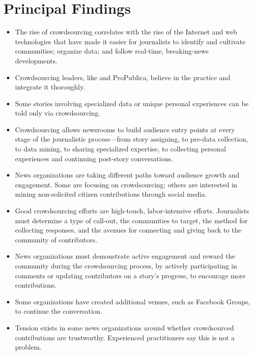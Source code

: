 \section{Principal Findings}  

\begin{itemize}
\item The rise of crowdsourcing correlates with the rise of the Internet and web technologies that have made it easier for journalists to identify and cultivate communities; organize data; and follow real-time, breaking-news developments.

\item Crowdsourcing leaders, like  and ProPublica, believe in the practice and integrate it thoroughly.

\item Some stories involving specialized data or unique personal experiences can be told only via crowdsourcing. 

\item Crowdsourcing allows newsrooms to build audience entry points at every stage of the journalistic process---from story assigning, to pre-data collection, to data mining, to sharing specialized expertise, to collecting personal experiences and continuing post-story conversations.
 
\item News organizations are taking different paths toward audience growth and engagement. Some are focusing on crowdsourcing; others are interested in mining non-solicited citizen contributions through social media.

\item Good crowdsourcing efforts are high-touch, labor-intensive efforts. Journalists must determine a type of call-out, the communities to target, the method for collecting responses, and the avenues for connecting and giving back to the community of contributors. 

\item News organizations must demonstrate active engagement and reward the community during the crowdsourcing process, by actively participating in comments or updating contributors on a story’s progress, to encourage more contributions.

\item Some organizations have created additional venues, such as Facebook Groups, to continue the conversation.

\item Tension exists in some news organizations around whether crowdsourced contributions are trustworthy. Experienced practitioners say this is not a problem. 


\end{itemize}
